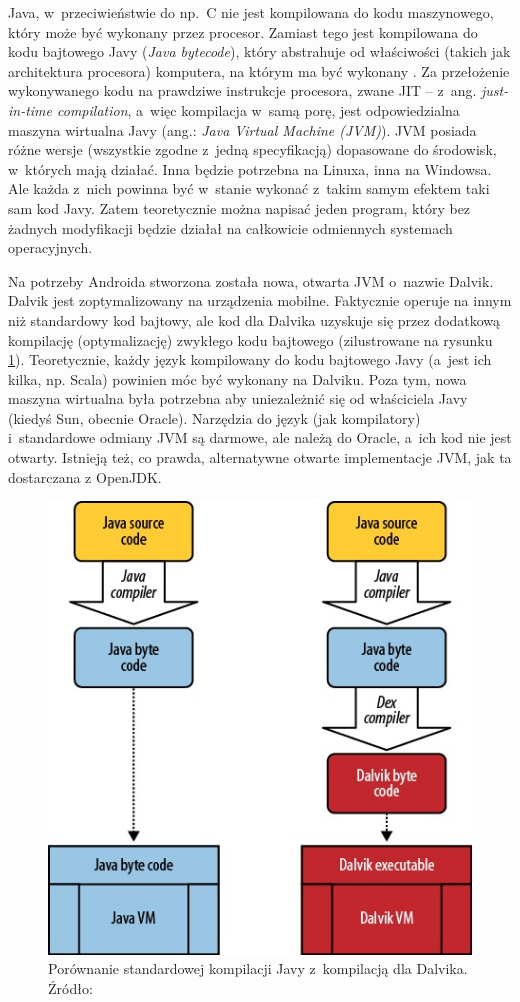 Java, w~przeciwieństwie do np.~C nie jest kompilowana do kodu maszynowego, który może być wykonany przez procesor. Zamiast tego jest kompilowana do kodu bajtowego Javy (\emph{Java bytecode}), który abstrahuje od właściwości (takich jak architektura procesora) komputera, na którym ma być wykonany \cite{jvm}. Za przełożenie wykonywanego kodu na prawdziwe instrukcje procesora, zwane JIT -- z~ang. \emph{just-in-time compilation}, a~więc kompilacja w~samą porę, jest odpowiedzialna maszyna wirtualna Javy (ang.: \emph{Java Virtual Machine (JVM)}). JVM posiada różne wersje (wszystkie zgodne z~jedną specyfikacją) dopasowane do środowisk, w~których mają działać. Inna będzie potrzebna na Linuxa, inna na Windowsa. Ale każda z~nich powinna być w~stanie wykonać z~takim samym efektem taki sam kod Javy. Zatem teoretycznie można napisać jeden program, który bez żadnych modyfikacji będzie działał na całkowicie odmiennych systemach operacyjnych.

Na potrzeby Androida stworzona została nowa, otwarta JVM o~nazwie Dalvik. Dalvik jest zoptymalizowany na urządzenia mobilne. Faktycznie operuje na innym niż standardowy kod bajtowy, ale kod dla Dalvika uzyskuje się przez dodatkową kompilację (optymalizację) zwykłego kodu bajtowego (zilustrowane na rysunku \ref{fig:dalvik-compilation}). Teoretycznie, każdy język kompilowany do kodu bajtowego Javy (a~jest ich kilka, np. Scala) powinien móc być wykonany na Dalviku.
Poza tym, nowa maszyna wirtualna była potrzebna aby uniezależnić się od właściciela Javy (kiedyś Sun, obecnie Oracle). Narzędzia do język (jak kompilatory) i~standardowe odmiany JVM są darmowe, ale należą do Oracle, a~ich kod nie jest otwarty. Istnieją też, co prawda, alternatywne otwarte implementacje JVM, jak ta dostarczana z OpenJDK.

\begin{figure}
	\centering
		\includegraphics[scale=0.75]{img/dalvik-compilation.jpg}
	\caption{Porównanie standardowej kompilacji Javy z~kompilacją dla Dalvika. Źródło: \cite{learningandroid}}
	\label{fig:dalvik-compilation}
\end{figure}

